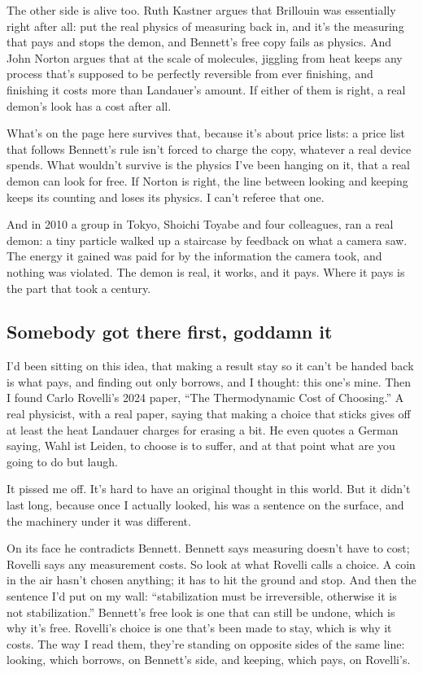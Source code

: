 \documentclass[11pt,twoside]{article}
\theoremstyle{thielethm}
\theoremstyle{thieledef}
\theoremstyle{thieledef}
\theoremstyle{thieledef}
\theoremstyle{thielethm}
\theoremstyle{thieleobs}
\theoremstyle{thielethm}
\begin{document}
The other side is alive too. Ruth Kastner argues that Brillouin was essentially right after all: put the real physics of measuring back in, and it's the measuring that pays and stops the demon, and Bennett's free copy fails as physics. And John Norton argues that at the scale of molecules, jiggling from heat keeps any process that's supposed to be perfectly reversible from ever finishing, and finishing it costs more than Landauer's amount. If either of them is right, a real demon's look has a cost after all.

What's on the page here survives that, because it's about price lists: a price list that follows Bennett's rule isn't forced to charge the copy, whatever a real device spends. What wouldn't survive is the physics I've been hanging on it, that a real demon can look for free. If Norton is right, the line between looking and keeping keeps its counting and loses its physics. I can't referee that one.

And in 2010 a group in Tokyo, Shoichi Toyabe and four colleagues, ran a real demon: a tiny particle walked up a staircase by feedback on what a camera saw. The energy it gained was paid for by the information the camera took, and nothing was violated. The demon is real, it works, and it pays. Where it pays is the part that took a century.

\subsection{Somebody got there first, goddamn it}

I'd been sitting on this idea, that making a result stay so it can't be handed back is what pays, and finding out only borrows, and I thought: this one's mine. Then I found Carlo Rovelli's 2024 paper, ``The Thermodynamic Cost of Choosing.'' A real physicist, with a real paper, saying that making a choice that sticks gives off at least the heat Landauer charges for erasing a bit. He even quotes a German saying, Wahl ist Leiden, to choose is to suffer, and at that point what are you going to do but laugh.

It pissed me off. It's hard to have an original thought in this world. But it didn't last long, because once I actually looked, his was a sentence on the surface, and the machinery under it was different.

On its face he contradicts Bennett. Bennett says measuring doesn't have to cost; Rovelli says any measurement costs. So look at what Rovelli calls a choice. A coin in the air hasn't chosen anything; it has to hit the ground and stop. And then the sentence I'd put on my wall: ``stabilization must be irreversible, otherwise it is not stabilization.'' Bennett's free look is one that can still be undone, which is why it's free. Rovelli's choice is one that's been made to stay, which is why it costs. The way I read them, they're standing on opposite sides of the same line: looking, which borrows, on Bennett's side, and keeping, which pays, on Rovelli's.
\end{document}
